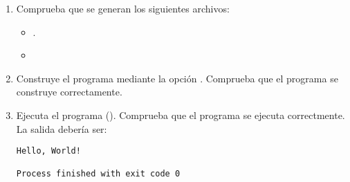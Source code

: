 \begin{enumerate}
\begin{enumerate}
\item Comprueba que se generan los siguientes archivos:
\begin{itemize}
  \item {}.
  \item {}
\end{itemize}

\item Construye el programa mediante la opción . 
Comprueba que el programa se construye correctamente.

\item Ejecuta el programa ().
Comprueba que el programa se ejecuta correctmente. La salida debería ser:

\begin{lstlisting}[style=terminal]
Hello, World!

Process finished with exit code 0
\end{lstlisting}

\end{enumerate}

\end{enumerate}
